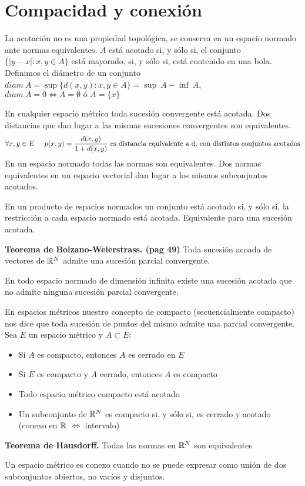 \section{Compacidad y conexión}
La acotación no es una propiedad topológica, se conserva en un espacio normado ante normas equivalentes. 
$A$ está acotado si, y sólo si, el conjunto $\{|y-x| : x,y\in A\}$ está mayorado, si, y sólo si, está contenido en una bola.
Definimos el diámetro de un conjunto $diam\ A=\sup \{d(x,y) : x,y\in A\}=\sup \ A-\inf \ A$, $diam \ A=0\Longleftrightarrow A=\emptyset \text{ ó } A=\{x\}$

En cualquier espacio métrico toda sucesión convergente está acotada. Dos distancias que dan lugar a las mismas sucesiones convergentes son equivalentes.
$$ \forall x,y\in E \hspace{0.5cm}p(x,y) = \frac{d(x,y)}{1+d(x,y)}\text{ es distancia equivalente a d, con distintos conjuntos acotados} $$
En un espacio normado todas las normas son equivalentes.
Dos normas equivalentes en un espacio vectorial dan lugar a los mismos subconjuntos acotados.

En un producto de espacios normados un conjunto está acotado si, y sólo si, la restricción a cada espacio normado está acotada. Equivalente para una sucesión acotada.

\textbf{Teorema de Bolzano-Weierstrass. (pag 49)} Toda sucesión acoada de vectores de $\mathbb{R}^N$ admite una sucesión parcial convergente.
	
En todo espacio normado de dimensión infinita existe una sucesión acotada que no admite ninguna sucesión parcial convergente.

En espacios métricos nuestro concepto de compacto (secuencialmente compacto) nos dice que toda sucesión de puntos del mismo admite una parcial convergente.
Sea $E$ un espacio métrico y $A\subset E$:
\begin{itemize}
	\item Si $A$ es compacto, entonces $A$ es cerrado en $E$
	\item Si $E$ es compacto y $A$ cerrado, entonces $A$ es compacto
	\item Todo espacio métrico compacto está acotado
	\item Un subconjunto de $\mathbb{R}^N$ es compacto si, y sólo si, es cerrado y acotado (conexo en $\mathbb{R}$ $\Longleftrightarrow$ intervalo)
\end{itemize}
\textbf{Teorema de Hausdorff.} Todas las normas en $\mathbb{R}^N$ son equivalentes

Un espacio métrico es conexo cuando no se puede expresar como unión de dos subconjuntos abiertos, no vacíos y disjuntos.


